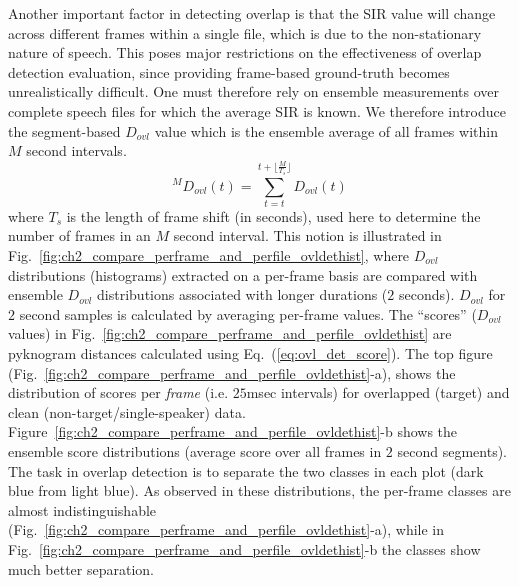 {Another important factor in detecting overlap is that the SIR value will change across different frames within a single file, which is due to the non-stationary nature of speech. 
This poses major restrictions on the effectiveness of overlap detection evaluation, since providing frame-based ground-truth becomes unrealistically difficult. 
One must therefore rely on ensemble measurements over complete speech files for which the average SIR is known. 
We therefore introduce the segment-based $D_{ovl}$ value which is the ensemble average of all frames within $M$ second intervals. 
\begin{equation}
\label{eq:seg_dovl}
^{M}D_{ovl}(t) = \sum_{t = t}^{t+\lfloor \frac{M}{T_s} \rfloor} D_{ovl}(t)
\end{equation}
where $T_s$ is the length of frame shift (in seconds), used here to determine the number of frames in an $M$ second interval. 
This notion is illustrated in Fig.~\ref{fig:ch2_compare_perframe_and_perfile_ovldethist}, where $D_{ovl}$ distributions (histograms) extracted on a per-frame basis are compared with ensemble $D_{ovl}$ distributions associated with longer durations ($2$ seconds). 
$D_{ovl}$ for $2$ second samples is calculated by averaging per-frame values. 
The ``scores'' ($D_{ovl}$ values) in Fig.~\ref{fig:ch2_compare_perframe_and_perfile_ovldethist} are pyknogram distances calculated using Eq.~(\ref{eq:ovl_det_score}). 
The top figure (Fig.~\ref{fig:ch2_compare_perframe_and_perfile_ovldethist}-a), shows the distribution of scores per {\it frame} (i.e. $25$msec intervals) for overlapped (target) and clean (non-target/single-speaker) data.  
Figure~\ref{fig:ch2_compare_perframe_and_perfile_ovldethist}-b shows the ensemble score distributions (average score over all frames in $2$ second segments). 
The task in overlap detection is to separate the two classes in each plot (dark blue from light blue). 
As observed in these distributions, the per-frame classes are almost indistinguishable (Fig.~\ref{fig:ch2_compare_perframe_and_perfile_ovldethist}-a), while in Fig.~\ref{fig:ch2_compare_perframe_and_perfile_ovldethist}-b the classes show much better separation. 


}
